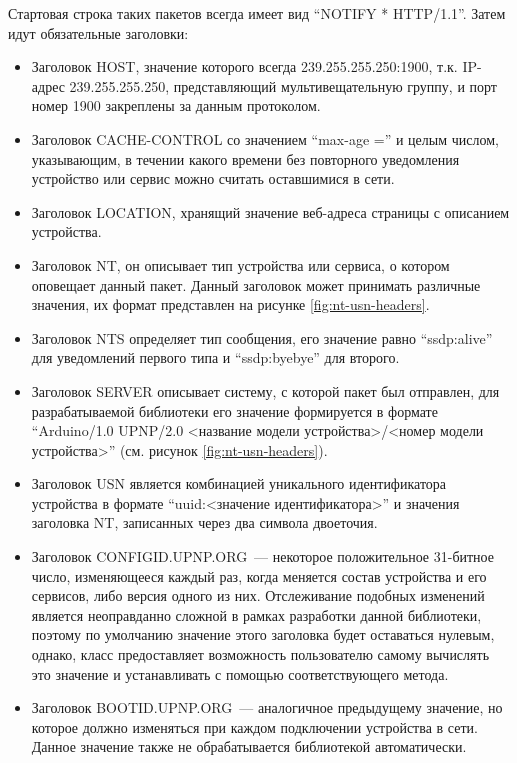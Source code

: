 Стартовая строка таких пакетов всегда имеет вид "`NOTIFY * HTTP/1.1"'.
Затем идут обязательные заголовки: 
\begin{itemize} 
	\item Заголовок HOST, значение которого всегда 239.255.255.250:1900, т.к.
	IP-адрес 239.255.255.250, представляющий мультивещательную группу, и порт номер 1900 закреплены за данным протоколом.
	\item Заголовок CACHE-CONTROL со значением "`max-age ="' и целым числом, указывающим, в течении какого времени без повторного уведомления устройство или сервис можно считать оставшимися в сети.
	\item Заголовок LOCATION, хранящий значение веб-адреса страницы с описанием устройства.
	\item Заголовок NT, он описывает тип устройства или сервиса, о котором оповещает данный пакет.
	Данный заголовок может принимать различные значения, их формат представлен на рисунке \ref{fig:nt-usn-headers}.
	\item Заголовок NTS определяет тип сообщения, его значение равно "`ssdp:alive"' для уведомлений первого типа и "`ssdp:byebye"' для второго.
	\item Заголовок SERVER описывает систему, с которой пакет был отправлен, для разрабатываемой библиотеки его значение формируется в формате "`Arduino/1.0 UPNP/2.0 <название модели устройства>/<номер модели устройства>"' (см. рисунок \ref{fig:nt-usn-headers}).
	\item Заголовок USN является комбинацией уникального идентификатора устройства в формате "`uuid:<значение идентификатора>"' и значения заголовка NT, записанных через два символа двоеточия.
	\item Заголовок CONFIGID.UPNP.ORG~--- некоторое положительное 31-битное число, изменяющееся каждый раз, когда меняется состав устройства и его сервисов, либо версия одного из них.
	Отслеживание подобных изменений является неоправданно сложной в рамках разработки данной библиотеки, поэтому по умолчанию значение этого заголовка будет оставаться нулевым, однако, класс предоставляет возможность пользователю самому вычислять это значение и устанавливать с помощью соответствующего метода.
	\item Заголовок BOOTID.UPNP.ORG~--- аналогичное предыдущему значение, но которое должно изменяться при каждом подключении устройства в сети.
	Данное значение также не обрабатывается библиотекой автоматически.
\end{itemize}


